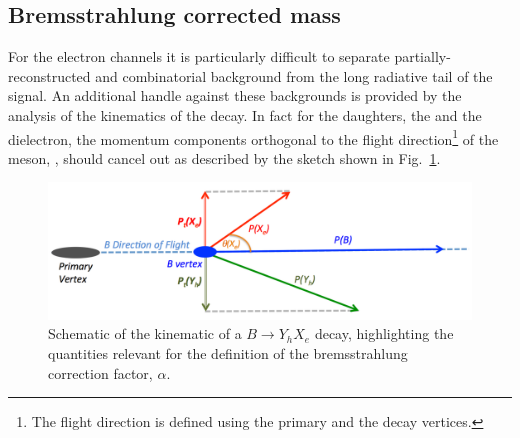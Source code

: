 %


\subsection{Bremsstrahlung corrected mass}
\label{sec:HOP}

For the electron channels it is particularly difficult to separate partially-reconstructed and combinatorial background from the 
long radiative tail of the signal. An additional handle against these backgrounds is provided by the analysis of the kinematics of the decay.
In fact for the \Bz daughters, the \Kstarz and the dielectron, the momentum components orthogonal to the flight 
direction\footnote{The flight direction is defined using the primary and the decay vertices.} of the \Bz meson, \pt, should cancel out as described by the sketch shown in Fig.~\ref{fig:schemaHOP}.
\begin{figure}[b]
 \centering
    \includegraphics[width=0.9\linewidth]{RKst/figs/HOP/schemaHOP.pdf}
  \caption{ Schematic of the kinematic of a $B \to Y_h X_e$ decay, highlighting the quantities relevant for the 
  definition of the bremsstrahlung correction factor, $\alpha$.}
  \label{fig:schemaHOP}
\end{figure}

